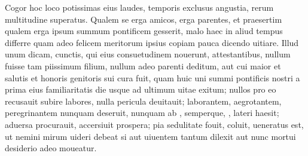 \documentclass[a5paper,twoside]{article}
\begin{document}
Cogor hoc loco potissimas eius  laudes,  temporis exclusus angustia,   rerum multitudine superatus.  Qualem se erga amicos,  erga parentes, et praesertim qualem erga ipsum summum pontificem gesserit, malo haec  in aliud tempus differre quam adeo felicem meritorum ipsius copiam pauca dicendo uitiare.  Illud unum dicam, cunctis, qui eius consuetudinem nouerunt, attestantibus, nullum fuisse tam piissimum filium, nullum adeo parenti deditum, aut cui maior et salutis et honoris genitoris sui cura fuit, quam huic uni summi pontificis nostri a prima eius familiaritatis die usque ad ultimum uitae exitum; nullos pro eo recusauit subire labores, nulla pericula deuitauit; laborantem, aegrotantem, peregrinantem nunquam deseruit, nunquam ab  , semperque, , lateri haesit; aduersa procurauit, accersiuit prospera; pia sedulitate fouit, coluit, ueneratus est, ut nemini mirum uideri debeat si aut uiuentem tantum dilexit aut nunc mortui desiderio adeo moueatur.
\end{document}
